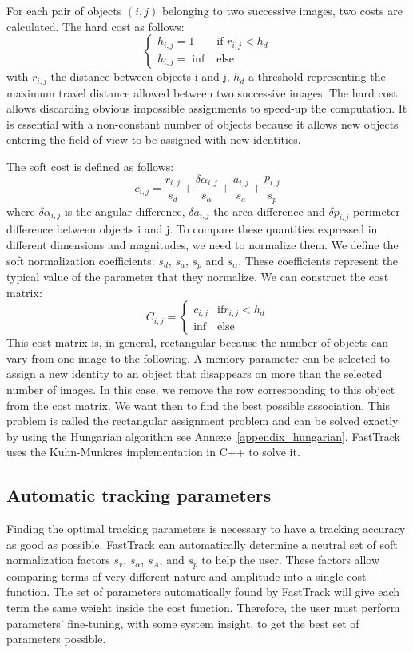     For each pair of objects $(i,j)$ belonging to two successive images, two costs are calculated.
    The hard cost as follows:
    $$
    \left\{
        \begin{array}{ll}
            h_{i,j} = 1 & \mbox{if } r_{i,j} < h_{d} \\
            h_{i,j} = \inf & \mbox{else }
        \end{array}
    \right.
    $$
    \noindent with $r_{i,j}$ the distance between objects i and j, $h_{d}$ a threshold representing the maximum travel distance allowed between two successive images. The hard cost allows discarding obvious impossible assignments to speed-up the computation. It is essential with a non-constant number of objects because it allows new objects entering the field of view to be assigned with new identities.

    The soft cost is defined as follows:
    $$
    c_{i,j} = \frac{r_{i,j}}{s_d} + \frac{\delta\alpha_{i,j}}{s_{\alpha}} + \frac{a_{i,j}}{s_a} + \frac{p_{i,j}}{s_p}
    $$
    \noindent where $\delta\alpha_{i,j}$ is the angular difference, $\delta a_{i,j}$ the area difference and $\delta p_{i,j}$ perimeter difference between objects i and j. To compare these quantities expressed in different dimensions and magnitudes, we need to normalize them. We define the soft normalization coefficients: $s_{d}$, $s_{a}$, $s_{p}$ and $s_{\alpha}$. These coefficients represent the typical value of the parameter that they normalize.
    We can construct the cost matrix:
    $$
    C_{i,j} = \left\{
        \begin{array}{ll}
            c_{i,j} & \mbox{if} r_{i,j} < h_{d} \\
            \inf & \mbox{else}
        \end{array}
    \right.
    $$
    This cost matrix is, in general, rectangular because the number of objects can vary from one image to the following. A memory parameter can be selected to assign a new identity to an object that disappears on more than the selected number of images. In this case, we remove the row corresponding to this object from the cost matrix.
    We want then to find the best possible association. This problem is called the rectangular assignment problem and can be solved exactly by using the Hungarian algorithm see Annexe~\ref{appendix_hungarian}. FastTrack uses the Kuhn-Munkres implementation in C++ to solve it.

    \subsection{Automatic tracking parameters}
    Finding the optimal tracking parameters is necessary to have a tracking accuracy as good as possible. FastTrack can automatically determine a neutral set of soft normalization factors $s_r$, $s_\alpha$, $s_A$, and $s_p$ to help the user. These factors allow comparing terms of very different nature and amplitude into a single cost function. The set of parameters automatically found by FastTrack will give each term the same weight inside the cost function. Therefore, the user must perform parameters' fine-tuning, with some system insight, to get the best set of parameters possible.

